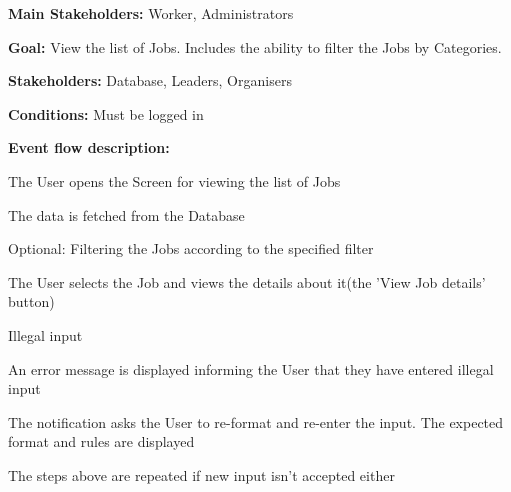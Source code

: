 				\noindent {}
				\begin{packed_item}
					\item \textbf{Main Stakeholders:} Worker, Administrators
					\item \textbf{Goal:} View the list of Jobs. Includes the ability to filter the Jobs by Categories.
					\item \textbf{Stakeholders: } Database, Leaders, Organisers
					\item \textbf{Conditions: } Must be logged in
					\item \textbf{Event flow description: }
					\begin{packed_enum}
						\item The User opens the Screen for viewing the list of Jobs
						\item The data is fetched from the Database
						\item Optional: Filtering the Jobs according to the specified filter
						\item The User selects the Job and views the details about it(the 'View Job details' button)
					\end{packed_enum}
					
					\begin{packed_item}
						\item[2.a] Illegal input
						\item[] \begin{packed_enum}
							\item An error message is displayed informing the User that they have entered illegal input
							\item The notification asks the User to re-format and re-enter the input. The expected format and rules are displayed
							\item The steps above are repeated if new input isn't accepted either
						\end{packed_enum}
					\end{packed_item}
				
				\end{packed_item}
			
